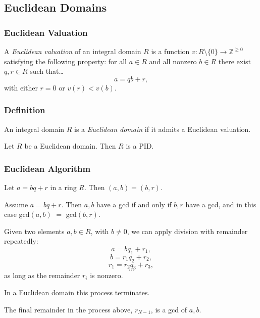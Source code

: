 \subsection{Euclidean Domains}\label{euclideandomains}

\subsubsection{Euclidean Valuation}\label{euclideanvaluation}
A \emph{Euclidean valuation} of an integral domain $R$ is a function $v : R \setminus \{ 0 \} \rightarrow \mathbb{Z}^{\geq 0}$ satisfying the following property:
for all $a \in R$ and all nonzero $b \in R$ there exist $q,r \in R$ such that\dots
$$a = qb + r,$$
with either $r=0$ or $v(r) < v(b)$.

\subsubsection{Definition}\label{definition}
An integral domain $R$ is a \emph{Euclidean domain} if it admits a Euclidean valuation.

\begin{proposition}
Let $R$ be a Euclidean domain. Then $R$ is a PID.
\end{proposition}

\subsubsection{Euclidean Algorithm}\label{euclideanalgorithm}

\begin{lemma}
Let $a = bq + r$ in a ring $R$. Then $(a,b) = (b,r)$.
\end{lemma}

\begin{corollary}
Assume $a = bq +r$. Then $a,b$ have a gcd if and only if $b,r$ have a gcd, and in this case gcd$(a,b)$ $=$ gcd$(b,r)$.
\end{corollary}

\begin{proposition}
Given two elements $a,b \in R$, with $b \neq 0$, we can apply division with remainder repeatedly:
$$a = bq_1 + r_1,$$
$$b = r_1q_2 + r_2,$$
$$r_1 = r_2q_3 + r_3,$$
$$\dots$$
as long as the remainder $r_i$ is nonzero.

In a Euclidean domain this process terminates.
\end{proposition}

\begin{proposition}
The final remainder in the process above, $r_{N-1}$, is a gcd of $a,b$.
\end{proposition}